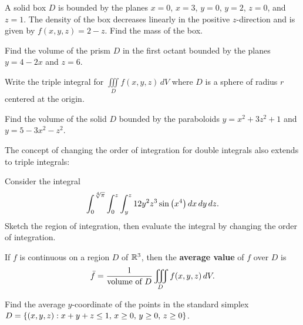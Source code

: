 \documentclass[../mathNotesPreamble]{subfiles}
\begin{document}
  \begin{ex*}
    A solid box $D$ is bounded by the planes $x=0$, $x=3$, $y=0$, $y=2$, $z=0$, and $z=1$. The density of the box decreases linearly in the positive $z$-direction and is given by $f(x,y,z)=2-z$. Find the mass of the box.
  \end{ex*}

  \begin{ex*}
    Find the volume of the prism $D$ in the first octant bounded by the planes $y=4-2x$ and $z=6$.
  \end{ex*}
  \pagebreak

  \begin{ex*}
    Write the triple integral for $\iiint\limits_D f(x,y,z)\,dV$ where $D$ is a sphere of radius $r$ centered at the origin.
  \end{ex*}
  \vspace*{5\baselineskip}
  \begin{ex*}
    Find the volume of the solid $D$ bounded by the paraboloids $y=x^2+3z^2+1$ and $y=5-3x^2-z^2$.
  \end{ex*}
  \pagebreak

  \noindent
  The concept of changing the order of integration for double integrals also extends to triple integrals:
  \begin{ex*}
    Consider the integral
      \[\int_0^{\sqrt[4]{\pi}} \int_0^z \int_y^z 12y^2z^3\sin{\left(x^4\right)}\,dx\,dy\,dz.\]
    Sketch the region of integration, then evaluate the integral by changing the order of integration.
  \end{ex*}
  \pagebreak

  \begin{defn*}
    If $f$ is continuous on a region $D$ of $\mathbb{R}^3$, then the \textbf{average value} of $f$ over $D$ is
      \[\bar{f}=\frac{1}{\textnormal{volume of }D}\iiint\limits_D f(x,y,z)\,dV.\]
  \end{defn*}

  \begin{ex*}
    Find the average $y$-coordinate of the points in the standard simplex \newline$D={\left\{(x,y,z): x+y+z\leq 1,\, x\geq 0,\, y\geq 0,\, z\geq 0\right\}}$.
  \end{ex*}

  \pagebreak
  
\end{document}
